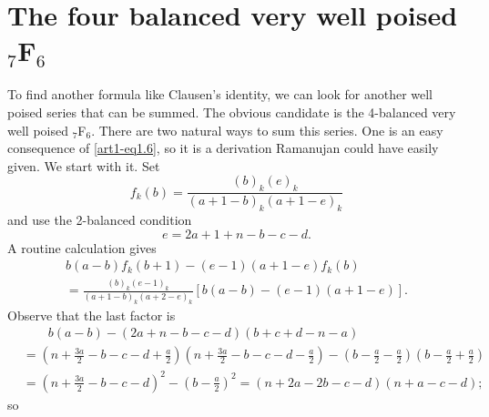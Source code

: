\section{The four balanced very well poised ${}_7$F$_6$}\label{art1-sec2}
To find another formula like Clausen's identity, we can look for another well poised series that can be summed. The obvious candidate is the 4-balanced very well poised ${}_7$F$_6$. There are two natural ways to sum this series. One is an easy consequence of \eqref{art1-eq1.6}, so it is a derivation Ramanujan could have easily given. We start with it. Set
\setcounter{equation}{0}
\begin{equation}
f_k (b) = \frac{(b)_k(e)_k}{(a+1-b)_k(a+1-e)_k}
\label{art1-eq2.1}
\end{equation}
and use the 2-balanced condition
\begin{equation}
e= 2 a + 1 + n -b - c - d. 
\label{art1-eq2.2}
\end{equation}
A routine calculation gives 
\begin{gather*}
b (a-b) f_k (b+1) - (e-1) (a+1-e)f_k (b)\\
= \frac{(b)_k(e-1)_k}{(a+1-b)_k (a+2 -e)_k} [b(a-b) -(e-1) (a+1-e)].
\end{gather*}
Observe that the last factor is 
\begin{align*}
& \qquad b (a-b) - (2 a+ n - b - c -d) (b+c + d- n -a)\\
& = (n+ \frac{3a}{2} - b - c - d + \frac{a}{2}) (n + \frac{3a}{2} - b - c -d -\frac{a}{2}) - (b - \frac{a}{2}- \frac{a}{2}) (b- \frac{a}{2} + \frac{a}{2})\\
& = (n+ \frac{3a}{2} - b - c - d)^2 - (b- \frac{a}{2})^2 = (n+2 a -  2 b - c -d) (n+a - c -d);
\end{align*}
so 

